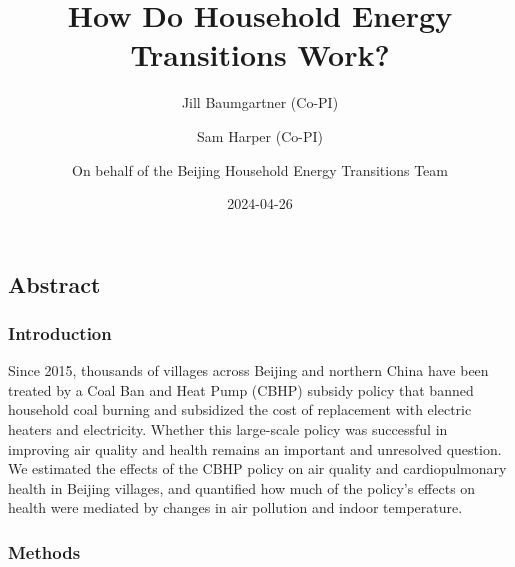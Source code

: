 \documentclass[
  letterpaper,
  DIV=11,
  numbers=noendperiod]{scrartcl}
\title{How Do Household Energy Transitions Work?}
\author{Jill Baumgartner (Co-PI) \and Sam Harper (Co-PI) \and On behalf
of the Beijing Household Energy Transitions Team}
\date{2024-04-26}
\renewcommand*\contentsname{Table of contents}
\newcommand\contentsname{Table of contents}
\begin{document}
\maketitle
\ifdefined\Shaded\renewenvironment{Shaded}{\begin{tcolorbox}[borderline west={3pt}{0pt}{shadecolor}, breakable, sharp corners, frame hidden, interior hidden, boxrule=0pt, enhanced]}{\end{tcolorbox}}\fi

\renewcommand*\contentsname{Table of contents}
{
\hypersetup{linkcolor=}
\setcounter{tocdepth}{3}
\tableofcontents
}
\hypertarget{abstract}{%
\subsection*{Abstract}\label{abstract}}

\hypertarget{introduction}{%
\subsubsection*{Introduction}\label{introduction}}

Since 2015, thousands of villages across Beijing and northern China have
been treated by a Coal Ban and Heat Pump (CBHP) subsidy policy that
banned household coal burning and subsidized the cost of replacement
with electric heaters and electricity. Whether this large-scale policy
was successful in improving air quality and health remains an important
and unresolved question. We estimated the effects of the CBHP policy on
air quality and cardiopulmonary health in Beijing villages, and
quantified how much of the policy's effects on health were mediated by
changes in air pollution and indoor temperature.

\hypertarget{methods}{%
\subsubsection*{Methods}\label{methods}}
\end{document}
